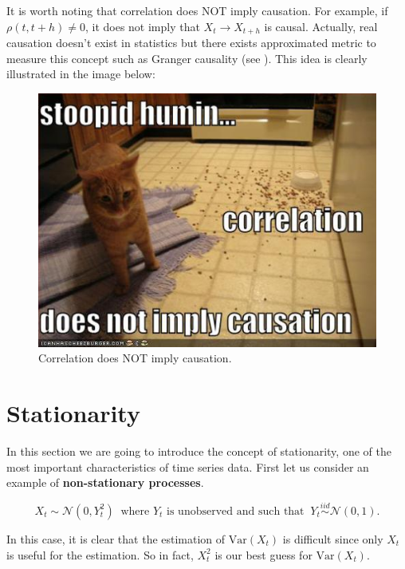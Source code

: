 \documentclass[]{book}
\theoremstyle{definition}
\theoremstyle{definition}
\theoremstyle{definition}
\theoremstyle{remark}
\let\BeginKnitrBlock\begin \let\EndKnitrBlock\end
\begin{document}
It is worth noting that correlation does NOT imply causation. For
example, if \(\rho(t, t+h) \neq 0\), it does not imply that
\(X_t \to X_{t+h}\) is causal. Actually, real causation doesn't exist in
statistics but there exists approximated metric to measure this concept
such as Granger causality (see \citet{granger1969investigating}). This
idea is clearly illustrated in the image below:

\begin{figure}

{\centering \includegraphics[width=0.5\linewidth]{images/corr_cat} 

}

\caption{Correlation does NOT imply causation.}\label{fig:unnamed-chunk-5}
\end{figure}

\hypertarget{stationarity}{%
\section{Stationarity}\label{stationarity}}

In this section we are going to introduce the concept of stationarity,
one of the most important characteristics of time series data. First let
us consider an example of \textbf{non-stationary processes}.

\BeginKnitrBlock{example}[Non-Stationary Process]
\protect\hypertarget{exm:exampleNonStationary}{}{\label{exm:exampleNonStationary}
{} }\begin{equation*}
X_t  \sim \mathcal{N} \left(0, Y_t^2\right) \;\; \text{where $Y_t$ is unobserved and such that} \;\; Y_t  \overset{iid}{\sim} \mathcal{N} \left(0, 1\right).
\end{equation*}

In this case, it is clear that the estimation of \(\text{Var}(X_t)\) is
difficult since only \(X_t\) is useful for the estimation. So in fact,
\(X_t^2\) is our best guess for \(\text{Var}(X_t)\).
\EndKnitrBlock{example}
\end{document}

